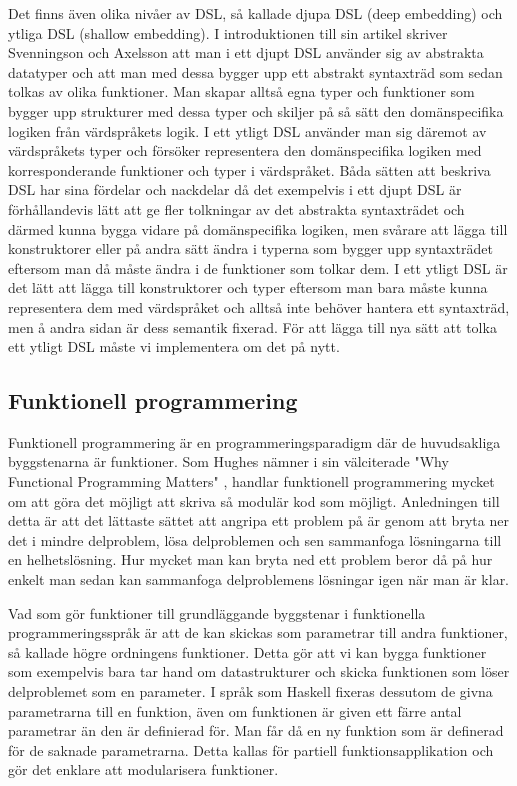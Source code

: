 \documentclass[]{article}
\begin{document}
Det finns även olika nivåer av DSL, så kallade djupa DSL (deep embedding) och
ytliga DSL (shallow embedding). I introduktionen till sin artikel skriver
Svenningson och Axelsson \cite{Svenningsson2013} att man i ett djupt
DSL använder sig av abstrakta datatyper och att man med dessa bygger upp ett
abstrakt syntaxträd som sedan tolkas av olika funktioner.
Man skapar alltså egna typer och funktioner som bygger upp strukturer med dessa
typer och skiljer på så sätt den domänspecifika logiken från värdspråkets logik.
I ett ytligt DSL använder man sig däremot av värdspråkets typer och försöker
representera den domänspecifika logiken med korresponderande funktioner och
typer i värdspråket.
Båda sätten att beskriva DSL har sina fördelar och nackdelar då det exempelvis
i ett djupt DSL är förhållandevis lätt att ge fler tolkningar av det abstrakta
syntaxträdet och därmed kunna bygga vidare på domänspecifika logiken,
men svårare att lägga till konstruktorer eller på andra sätt ändra i typerna som
bygger upp syntaxträdet eftersom man då måste ändra i de funktioner som tolkar
dem. I ett ytligt DSL är det lätt att lägga till konstruktorer och typer
eftersom man bara måste kunna representera dem med värdspråket och alltså inte
behöver hantera ett syntaxträd, men å andra sidan är dess semantik fixerad.
För att lägga till nya sätt att tolka ett ytligt DSL måste vi implementera
om det på nytt.

\subsection{Funktionell programmering}
Funktionell programmering är en programmeringsparadigm där de huvudsakliga
byggstenarna är funktioner.
Som Hughes nämner i sin välciterade "Why Functional Programming Matters"
\cite{hughes1989functional}, handlar funktionell programmering mycket om att göra det
möjligt att skriva så modulär kod som möjligt.
Anledningen till detta är att det lättaste sättet att angripa ett problem på är
genom att bryta ner det i mindre delproblem, lösa delproblemen och sen
sammanfoga lösningarna till en helhetslösning.
Hur mycket man kan bryta ned ett problem beror då på hur enkelt man sedan kan
sammanfoga delproblemens lösningar igen när man är klar.

Vad som gör funktioner till grundläggande byggstenar i funktionella
programmeringsspråk är att de kan skickas som parametrar till andra funktioner,
så kallade högre ordningens funktioner.
Detta gör att vi kan bygga funktioner som exempelvis bara tar hand om
datastrukturer och skicka funktionen som löser delproblemet som en parameter.
I språk som Haskell fixeras dessutom de givna parametrarna till en funktion,
även om funktionen är given ett färre antal parametrar än den är definierad för. Man får då en ny funktion som är definerad för de saknade parametrarna.
Detta kallas för partiell funktionsapplikation och gör det enklare att modularisera funktioner.
\end{document}
